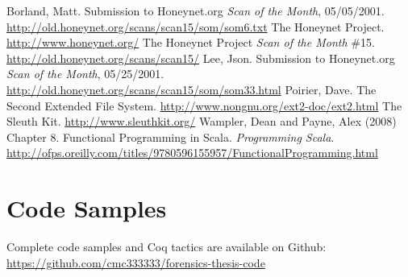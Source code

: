 \documentclass[nocopyrightspace]{sigplanconf}
\begin{document}




\begin{thebibliography}{}
\softraggedright

  Borland, Matt. Submission to Honeynet.org \emph{Scan of the Month},
  05/05/2001. \url{http://old.honeynet.org/scans/scan15/som/som6.txt}
  The Honeynet Project. \url{http://www.honeynet.org/}
  The Honeynet Project \emph{Scan of the Month} \#15.
  \url{http://old.honeynet.org/scans/scan15/}
  Lee, Json. Submission to Honeynet.org \emph{Scan of the Month}, 05/25/2001.
  \url{http://old.honeynet.org/scans/scan15/som/som33.html}
  Poirier, Dave. The Second Extended File System.
  \url{http://www.nongnu.org/ext2-doc/ext2.html}
  The Sleuth Kit. \url{http://www.sleuthkit.org/}
  Wampler, Dean and Payne, Alex (2008) Chapter 8. Functional Programming in
  Scala. {\em Programming Scala}. 
  \url{http://ofps.oreilly.com/titles/9780596155957/FunctionalProgramming.html}

\end{thebibliography}

\appendix

\section{Code Samples}
Complete code samples and Coq tactics are available on Github:
\url{https://github.com/cmc333333/forensics-thesis-code}
\end{document}
